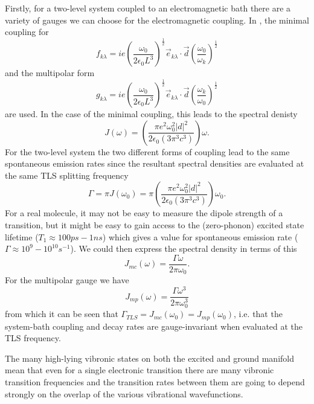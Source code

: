 \documentclass[]{article}
\begin{document}
Firstly, for a two-level system coupled to an electromagnetic bath there are a variety of gauges we can choose for the electromagnetic coupling. In \cite{Stokes2012}, the minimal coupling for
\begin{equation}
\label{eq:MinimalCouplingConst}
f_{k\lambda} = i e \left(\frac{\omega_0}{2\epsilon_0 L^3}\right)^{\frac{1}{2}} \vec{e}_{k \lambda}\cdot\vec{d} \left(\frac{\omega_0}{\omega_k}\right)^{\frac{1}{2}} 
\end{equation}
and the multipolar form
\begin{equation}
\label{eq:MultipolarCouplingConst}
g_{k\lambda} = i e \left(\frac{\omega_0}{2\epsilon_0 L^3}\right)^{\frac{1}{2}} \vec{e}_{k \lambda}\cdot\vec{d} \left(\frac{\omega_k}{\omega_0}\right)^{\frac{1}{2}} 
\end{equation}
are used. 
In the case of the minimal coupling, this leads to the spectral denisty
\begin{equation}
J(\omega) = \left(\frac{\pi e^2\omega_0^2 |d|^2}{2\epsilon_0(3\pi^3 c^3)}\right)\omega.
\end{equation}
For the two-level system the two different forms of coupling lead to the same spontaneous emission rates since the resultant spectral densities are evaluated at the same TLS splitting frequency
\begin{equation}
\label{eq:TLS_decay}
\Gamma = \pi J(\omega_0) = \pi\left(\frac{\pi e^2\omega_0^2 |d|^2}{2\epsilon_0(3\pi^3 c^3)}\right)\omega_0.
\end{equation}
For a real molecule, it may not be easy to measure the dipole strength of a transition, but it might be easy to gain access to the (zero-phonon) excited state lifetime ($T_1 \approx 100ps - 1ns$) which gives a value for spontaneous emission rate ($\Gamma\approx 10^9-10^{10}s^{-1}$). We could then express the spectral density in terms of this
\begin{equation}
\label{eq:MinimalSpectral}
J_{mc}(\omega) = \frac{\Gamma\omega}{2\pi\omega_0}.
\end{equation}
For the multipolar gauge we have
\begin{equation}
\label{eq:MultipolarSpectral}
J_{mp}(\omega) = \frac{\Gamma\omega^3}{2\pi\omega_0^3}
\end{equation}
from which it can be seen that $\Gamma_{TLS}=J_{mc}(\omega_0)=J_{mp}(\omega_0)$, i.e. that the system-bath coupling and decay rates are gauge-invariant when evaluated at the TLS frequency.

The many high-lying vibronic states on both the excited and ground manifold mean that even for a single electronic transition there are many vibronic transition frequencies and the transition rates between them are going to depend strongly on the overlap of the various vibrational wavefunctions. 
\end{document}
